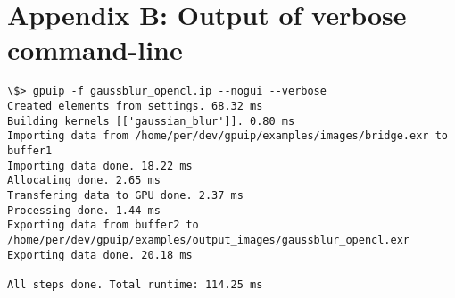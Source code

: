 \newpage
\section*{Appendix B: Output of verbose command-line}

\renewcommand{\lstlistingname}{Code}
\begin{lstlisting}[caption= Example command-line application with verbose option enabled, label=verb]
\$> gpuip -f gaussblur_opencl.ip --nogui --verbose
Created elements from settings. 68.32 ms
Building kernels [['gaussian_blur']]. 0.80 ms
Importing data from /home/per/dev/gpuip/examples/images/bridge.exr to buffer1 
Importing data done. 18.22 ms
Allocating done. 2.65 ms
Transfering data to GPU done. 2.37 ms
Processing done. 1.44 ms
Exporting data from buffer2 to /home/per/dev/gpuip/examples/output_images/gaussblur_opencl.exr 
Exporting data done. 20.18 ms

All steps done. Total runtime: 114.25 ms
\end{lstlisting}
